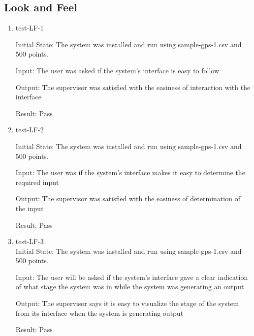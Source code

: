 \documentclass[12pt, titlepage]{article}
\begin{document}
\subsection{Look and Feel}
\begin{enumerate}

\item{test-LF-1} \label{test-LF-1}

Initial State: The system was installed and run using sample-gps-1.csv and 500 points.

Input: The user was asked if the system’s interface is easy to follow

Output: The supervisor was satisfied with the easiness of interaction with the interface

Result: Pass

\item{test-LF-2} \label{test-LF-2}

Initial State: The system was installed and run using sample-gps-1.csv and 500 points.

Input: The user was if the system’s interface makes it easy to
determine the required input

Output: The supervisor was satisfied with the easiness of determination of the input

Result: Pass

\item{test-LF-3\\} \label{test-LF-3}
Initial State: The system was installed and run using sample-gps-1.csv and 500 points.

Input: The user will be asked if the system’s interface gave a clear indication of what stage the system was in while the system was generating an output

Output: The supervisor says it is easy to visualize the stage of the system from its interface when the system is generating output

Result: Pass
					
\end{enumerate}
\end{document}
